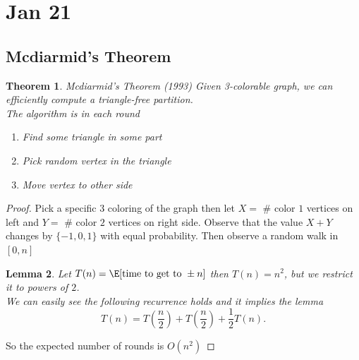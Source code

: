 \documentclass[a4paper]{article}
\newtheorem{thm}{Theorem}[section]
\newtheorem{lem}[thm]{Lemma}
\begin{document}
\section{Jan 21}
\subsection{Mcdiarmid's Theorem}
\begin{thm}
    Mcdiarmid's Theorem (1993) Given 3-colorable graph, we can efficiently compute a triangle-free partition. \\
    The algorithm is in each round \begin{enumerate}
        \item Find some triangle in some part
        \item Pick random vertex in the triangle
        \item Move vertex to other side
    \end{enumerate}
\end{thm}
\begin{proof}
    Pick a specific $3$ coloring of the graph then let $X=$ \# color $1$ vertices on left and $Y=$ \# color $2$ vertices on right side. Observe that the value $X+Y$ changes by $ \{-1,0,1\}$ with equal probability. Then observe a random walk in $[0,n]$ \\
    \begin{lem}
        Let $T(n)=\E[ \text{time to get to }\pm n]$ then $T(n)=n^2$, but we restrict it to powers of $2$.\\
        We can easily see the following recurrence holds and it implies the lemma \[
        T(n)=T \left( \frac{n}{2} \right)+ T \left( \frac{n}{2} \right)+\frac{1}{2}T(n)
        .\] 
    \end{lem}
    So the expected number of rounds is $O \left( n^2 \right)$
\end{proof}
\end{document}
